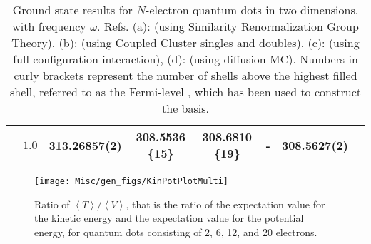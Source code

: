 \begin{table}[H]
\begin{centering}
{\begin{tabular}{cc|cccccc}
				 & $1.0$  & 313.26857(2) & 308.5536 \{15\} & 308.6810 \{19\} & -  & 308.5627(2)\tabularnewline
				\hline 
			\end{tabular}}
	\par\end{centering}

	\protect\caption{Ground state results for $N$-electron quantum dots in two dimensions, with frequency $\omega$. Refs. (a): \cite{reimannSRGT} (using Similarity Renormalization Group Theory), (b): \cite{hirthCC} (using Coupled Cluster singles and doubles), (c): \cite{olsenFCI} (using full configuration interaction), (d): \cite{hogbergetDMC} (using diffusion MC). Numbers in curly brackets represent the number of shells above the highest filled shell, referred to as the Fermi-level \cite{shavitt09}, which has been used to construct the basis.\label{tab:QD_ground_state}}
	\end{table}

\begin{figure}[H]
	\begin{centering}
		\texttt{[image: Misc/gen\_figs/KinPotPlotMulti]}
		
	\par\end{centering}

	\protect\caption{Ratio of $\left\langle T\right\rangle /\left\langle V\right\rangle $, that is the ratio of the expectation value for the kinetic energy and the expectation value for the potential energy,
	for quantum dots consisting of 2, 6, 12, and 20 electrons. \label{fig:TV_ratio}}
\end{figure}

